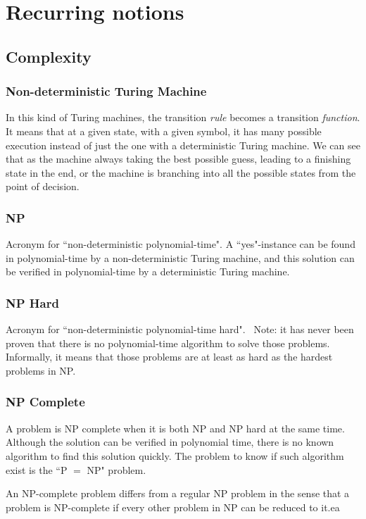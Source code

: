 \documentclass[12pt,a4paper]{article}
\theoremstyle{customdef}
\begin{document}
\section{Recurring notions}
\subsection{Complexity}


\subsubsection{Non-deterministic Turing Machine}
In this kind of Turing machines, the transition \textit{rule} becomes a transition \textit{function}.
It means that at a given state, with a given symbol, it has many possible execution instead of just the one with a deterministic Turing machine.
We can see that as the machine always taking the best possible guess, leading to a finishing state in the end, or the machine is branching into all the possible states from the point of decision.

\subsubsection{NP}
Acronym for ``non-deterministic polynomial-time".
A ``yes"-instance can be found in polynomial-time by a non-deterministic Turing machine, and this solution can be verified in polynomial-time by a deterministic Turing machine.


\subsubsection{NP Hard}
Acronym for ``non-deterministic polynomial-time hard".
~\newline{}\noindent Note: it has never been proven that there is no polynomial-time algorithm to solve those problems.
Informally, it means that those problems are at least as hard as the hardest problems in NP.

\subsubsection{NP Complete}
A problem is NP complete when it is both NP and NP hard at the same time.
Although the solution can be verified in polynomial time, there is no known algorithm to find this solution quickly.
The problem to know if such algorithm exist is the ``P $=$ NP" problem.

An NP-complete problem differs from a regular NP problem in the sense that a problem is NP-complete if every other problem in NP can be reduced to it.ea
\end{document}
